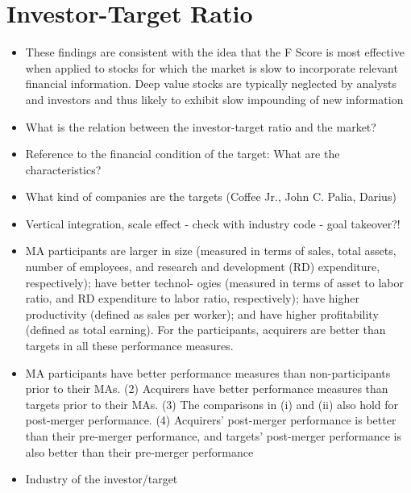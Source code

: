 \documentclass[12pt]{article}
\begin{document}
\section{Investor-Target Ratio} 

    \begin{itemize}

        \item These findings are consistent with the idea that the F Score is most effective when applied to stocks for which the market is slow to incorporate relevant financial information. Deep value stocks are typically neglected by analysts and investors and thus likely to exhibit slow impounding of new information \citep{Hyde2014}
        
        \item What is the relation between the investor-target ratio and the market?
        
        \item Reference to the financial condition of the target: What are the characteristics?
        
        \item What kind of companies are the targets (Coffee Jr., John C. Palia, Darius)

        \item Vertical integration, scale effect - check with industry code - goal takeover?! 
        
        \item MA participants are larger in size (measured in terms of sales, total assets, number of employees, and research and development (RD) expenditure, respectively); have better technol- ogies (measured in terms of asset to labor ratio, and RD expenditure to labor ratio, respectively); have higher productivity (defined as sales per worker); and have higher profitability (defined as total earning). For the participants, acquirers are better than targets in all these performance measures. \citep{Liu2013}

        \item MA participants have better performance measures than non-participants prior to their MAs.
        (2) Acquirers have better performance measures than targets prior to their MAs. (3) The comparisons in (i) and (ii) also hold for post-merger performance. (4) Acquirers’ post-merger performance is better than their pre-merger performance, and targets’ post-merger performance is also better than their pre-merger performance \citep{Liu2013}

        \item Industry of the investor/target


    \end{itemize}
\end{document}
